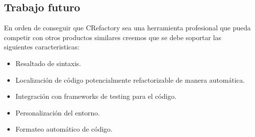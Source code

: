 \documentclass[a4paper,oneside,10pt]{article}
\begin{document}
\subsection{Trabajo futuro}
En orden de conseguir que CRefactory sea una herramienta profesional que pueda competir con otros productos similares creemos que se debe soportar las siguientes caracteristicas:
\begin{itemize}
	\item Resaltado de sintaxis.
	\item Localizaci\'on de c\'odigo potencialmente refactorizable de manera autom\'atica.
	\item Integraci\'on con frameworks de testing para el c\'odigo.
	\item Personalizaci\'on del entorno.
	\item Formateo autom\'atico de c\'odigo.
\end{itemize}
\end{document}
